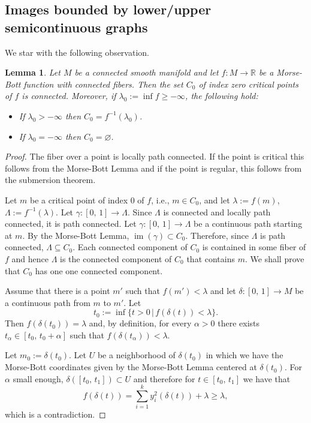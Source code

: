 \documentclass[11pt]{article}
\newtheorem{lemma}[theorem]{Lemma}
\renewcommand{\geq}{\geqslant}
\begin{document}
\subsection{Images bounded by lower/upper semicontinuous graphs}

We star with the following observation.

\begin{lemma} \label{lemma:critical-set} Let $M$ be a connected smooth
  manifold and let $f \colon M \to \mathbb{R}$ be a Morse-Bott
  function with connected fibers. Then the set $C_0$ of index zero
  critical points of $f$ is connected. Moreover, if $\lambda_0:=\inf
  f\geq -\infty$, the following hold:
  \begin{itemize}
  \item[{\rm (1)}] If $\lambda_0>-\infty$ then
    $C_0=f^{-1}(\lambda_0)$.
  \item[{\rm (2)}] If $\lambda_0=-\infty$ then $C_0=\varnothing$.
  \end{itemize}
\end{lemma}

\begin{proof}
  The fiber over a point is locally path connected. If the point is
  critical this follows from the Morse-Bott Lemma and if the point is
  regular, this follows from the submersion theorem.

  Let $m$ be a critical point of index $0$ of $f$, i.e., $m \in C_0$,
  and let $\lambda:=f(m)$, $\Lambda:=f^{-1}(\lambda)$. Let $\gamma
  \colon [0,\,1] \to \Lambda$. Since $\Lambda$ is connected and
  locally path connected, it is path connected.  Let $\gamma \colon
  [0,\,1] \to \Lambda$ be a continuous path starting at $m$. By the
  Morse-Bott Lemma, $\operatorname{im}(\gamma) \subset
  C_0$. Therefore, since $\Lambda$ is path connected,
  $\Lambda\subseteq C_0$.  Each connected component of $C_0$ is
  contained in some fiber of $f$ and hence $\Lambda$ is the connected
  component of $C_0$ that contains $m$. We shall prove that $C_0$ has
  one one connected component.

  Assume that there is a point $m'$ such that $f(m')<\lambda$ and let
  $\delta\colon [0,\,1] \to M$ be a continuous path from $m$ to
  $m'$. Let
$$
t_0:=\inf\{t>0 \, | \, f(\delta(t))<\lambda\}.
$$
Then $f(\delta(t_0))=\lambda$ and, by definition, for every $\alpha>0$
there exists $t_{\alpha} \in [t_0,\, t_0+\alpha]$ such that
$f(\delta(t_{\alpha}))<\lambda$.

Let $m_0:=\delta(t_0)$. Let $U$ be a neighborhood of $\delta(t_0)$ in
which we have the Morse-Bott coordinates given by the Morse-Bott Lemma
centered at $\delta(t_0)$. For $\alpha$ small enough,
$\delta([t_0,\,t_1]) \subset U$ and therefore for $t \in [t_0,\,t_1]$
we have that
$$
f(\delta(t)) =\sum_{i=1}^k y_i^2(\delta(t)) +\lambda \geq \lambda,
$$
which is a contradiction.
\end{proof}
\end{document}
